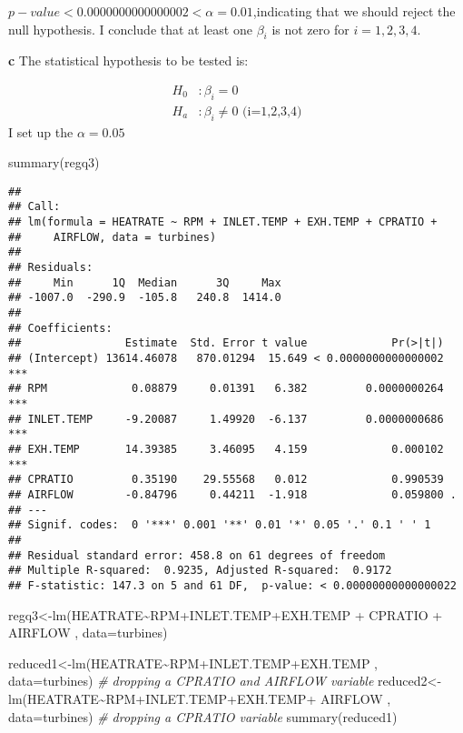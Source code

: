 \documentclass[
]{article}
\newenvironment{Shaded}{\begin{snugshade}}{\end{snugshade}}
\newcommand{\AttributeTok}[1]{\textcolor[rgb]{0.77,0.63,0.00}{#1}}
\newcommand{\CommentTok}[1]{\textcolor[rgb]{0.56,0.35,0.01}{\textit{#1}}}
\newcommand{\FunctionTok}[1]{\textcolor[rgb]{0.00,0.00,0.00}{#1}}
\newcommand{\NormalTok}[1]{#1}
\newcommand{\OtherTok}[1]{\textcolor[rgb]{0.56,0.35,0.01}{#1}}
\newcommand{\SpecialCharTok}[1]{\textcolor[rgb]{0.00,0.00,0.00}{#1}}
\begin{document}
\(p-value< 0.0000000000000002 < \alpha=0.01\),indicating that we should
reject the null hypothesis. I conclude that at least one \(β_i\) is not
zero for \(i=1,2,3,4\).

\textbf{c} The statistical hypothesis to be tested is:

\[
\begin{aligned}
H_0&:\beta_i=0\\
H_a&:\beta_i\neq0\mbox{    (i=1,2,3,4)}
\end{aligned}
\] I set up the \(\alpha = 0.05\)

\begin{Shaded}
\begin{Highlighting}[]
\FunctionTok{summary}\NormalTok{(regq3)}
\end{Highlighting}
\end{Shaded}

\begin{verbatim}
## 
## Call:
## lm(formula = HEATRATE ~ RPM + INLET.TEMP + EXH.TEMP + CPRATIO + 
##     AIRFLOW, data = turbines)
## 
## Residuals:
##     Min      1Q  Median      3Q     Max 
## -1007.0  -290.9  -105.8   240.8  1414.0 
## 
## Coefficients:
##                Estimate  Std. Error t value             Pr(>|t|)    
## (Intercept) 13614.46078   870.01294  15.649 < 0.0000000000000002 ***
## RPM             0.08879     0.01391   6.382         0.0000000264 ***
## INLET.TEMP     -9.20087     1.49920  -6.137         0.0000000686 ***
## EXH.TEMP       14.39385     3.46095   4.159             0.000102 ***
## CPRATIO         0.35190    29.55568   0.012             0.990539    
## AIRFLOW        -0.84796     0.44211  -1.918             0.059800 .  
## ---
## Signif. codes:  0 '***' 0.001 '**' 0.01 '*' 0.05 '.' 0.1 ' ' 1
## 
## Residual standard error: 458.8 on 61 degrees of freedom
## Multiple R-squared:  0.9235, Adjusted R-squared:  0.9172 
## F-statistic: 147.3 on 5 and 61 DF,  p-value: < 0.00000000000000022
\end{verbatim}

\begin{Shaded}
\begin{Highlighting}[]
\NormalTok{regq3}\OtherTok{\textless{}{-}}\FunctionTok{lm}\NormalTok{(HEATRATE}\SpecialCharTok{\textasciitilde{}}\NormalTok{RPM}\SpecialCharTok{+}\NormalTok{INLET.TEMP}\SpecialCharTok{+}\NormalTok{EXH.TEMP }\SpecialCharTok{+}\NormalTok{ CPRATIO }\SpecialCharTok{+}\NormalTok{ AIRFLOW , }\AttributeTok{data=}\NormalTok{turbines)}

\NormalTok{reduced1}\OtherTok{\textless{}{-}}\FunctionTok{lm}\NormalTok{(HEATRATE}\SpecialCharTok{\textasciitilde{}}\NormalTok{RPM}\SpecialCharTok{+}\NormalTok{INLET.TEMP}\SpecialCharTok{+}\NormalTok{EXH.TEMP , }\AttributeTok{data=}\NormalTok{turbines) }\CommentTok{\# dropping a CPRATIO and AIRFLOW variable}
\NormalTok{reduced2}\OtherTok{\textless{}{-}}\FunctionTok{lm}\NormalTok{(HEATRATE}\SpecialCharTok{\textasciitilde{}}\NormalTok{RPM}\SpecialCharTok{+}\NormalTok{INLET.TEMP}\SpecialCharTok{+}\NormalTok{EXH.TEMP}\SpecialCharTok{+}\NormalTok{ AIRFLOW , }\AttributeTok{data=}\NormalTok{turbines) }\CommentTok{\# dropping a CPRATIO variable}
\FunctionTok{summary}\NormalTok{(reduced1)}
\end{Highlighting}
\end{Shaded}
\end{document}

